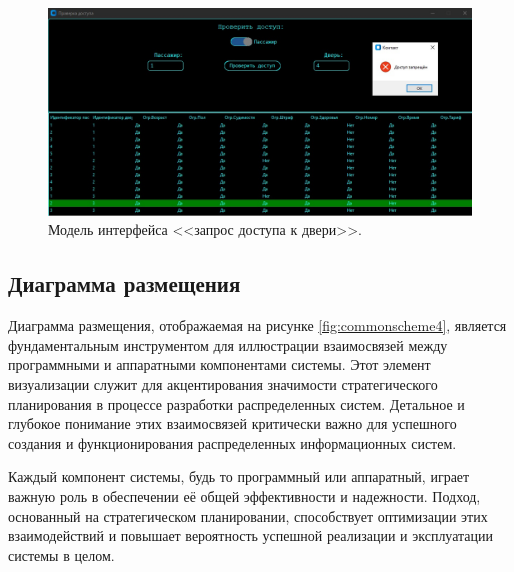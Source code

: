 \begin{figure} [ht]
	\centering
	\includegraphics[width=1\linewidth]{images/Example3}
	\caption{Модель интерфейса <<запрос доступа к двери>>.}
	\label{fig:example3}
\end{figure}


\subsection{Диаграмма размещения}
Диаграмма размещения, отображаемая на рисунке \ref{fig:commonscheme4}, является фундаментальным инструментом для иллюстрации взаимосвязей между программными и аппаратными компонентами системы. Этот элемент визуализации служит для акцентирования значимости стратегического планирования
в процессе разработки распределенных систем. Детальное и глубокое понимание этих взаимосвязей критически важно для успешного создания и функционирования распределенных информационных систем.

Каждый компонент системы, будь то программный или аппаратный, играет важную роль в обеспечении её общей эффективности и надежности.
Подход, основанный на стратегическом планировании, способствует оптимизации этих взаимодействий и повышает вероятность успешной реализации и эксплуатации системы в целом.

